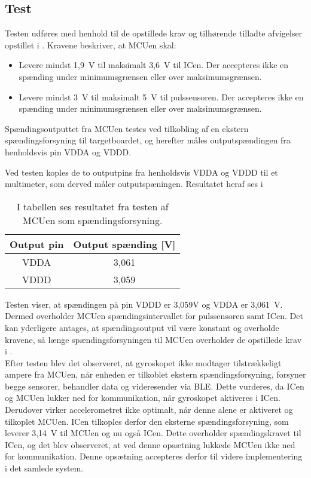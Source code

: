 \subsection{Test}
Testen udføres med henhold til de opstillede krav og tilhørende tilladte afvigelser opstillet i . Kravene beskriver, at MCUen skal:
\begin{itemize}
	\item Levere mindst 1,9~V til maksimalt 3,6~V til ICen. Der accepteres ikke en spænding under minimumsgrænsen eller over maksimumsgrænsen.
	\item Levere mindst 3~V til maksimalt 5~V til pulssensoren. Der accepteres ikke en spænding under minimumsgrænsen eller over maksimumsgrænsen.
\end{itemize}
Spændingsoutputtet fra MCUen testes ved tilkobling af en ekstern spændingsforsyning til targetboardet, og herefter måles outputspændingen fra henholdsvis pin VDDA og VDDD.

Ved testen koples de to outputpins fra henholdsvis VDDA og VDDD til et multimeter, som derved måler outputspæningen. Resultatet heraf ses i 
\begin{table}[H]
	\centering
	\begin{tabular}{cc}
		\hline
		\cellcolor[HTML]{C0C0C0} Output pin & \cellcolor[HTML]{C0C0C0} Output spænding {[}V{]} \\ \hline
		VDDA & 3,061 \\ \hline
		VDDD & 3,059  \\ \hline
	\end{tabular}
	\caption{I tabellen ses resultatet fra testen af MCUen som spændingsforsyning.}
	\label{tab:IC_spaending}
\end{table}\vspace{-0.2cm}
Testen viser, at spændingen på pin VDDD er 3,059V og VDDA er 3,061~V. Dermed overholder MCUen spændingsintervallet for pulssensoren samt ICen. Det kan yderligere antages, at spændingsoutput vil være konstant og overholde kravene, så længe spændingsforsyningen til MCUen overholder de opstillede krav i .\\
Efter testen blev det observeret, at gyroskopet ikke modtager tilstrækkeligt ampere fra MCUen, når enheden er tilkoblet ekstern spændingsforsyning, forsyner begge sensorer, behandler data og videresender via BLE. Dette vurderes, da ICen og MCUen lukker ned for kommunikation, når gyroskopet aktiveres i ICen. Derudover virker accelerometret ikke optimalt, når denne alene er aktiveret og tilkoplet MCUen. ICen tilkoples derfor den eksterne spændingsforsyning, som leverer 3,14~V til MCUen og nu også ICen. Dette overholder spændingskravet til ICen, og det blev observeret, at ved denne opsætning lukkede MCUen ikke ned for kommunikation. Denne opsætning accepteres derfor til videre implementering i det samlede system.

